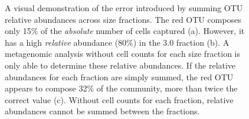 \begin{figure}
\quad
{}
\caption[Summing relative abundances across size fractions]{A visual demonstration of the error introduced by summing OTU relative abundances across size fractions. The red OTU composes only 15\% of the \emph{absolute} number of cells captured (a). However, it has a high \emph{relative} abundance (80\%) in the 3.0 \micron{} fraction (b). A metagenomic analysis without cell counts for each size fraction is only able to determine these relative abundances. If the relative abundances for each fraction are simply summed, the red OTU appears to compose 32\% of the community, more than twice the correct value (c). Without cell counts for each fraction, relative abundances cannot be summed between the fractions.}
\label{fig:fractionabundances}
\end{figure}
